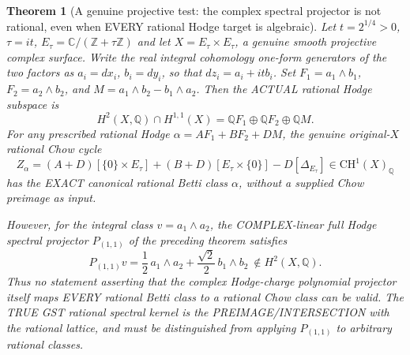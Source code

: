 \documentclass[11pt]{article}
\newtheorem{theorem}{Theorem}
\newcommand{\QQ}{\mathbb Q}
\newcommand{\CC}{\mathbb C}
\newcommand{\CH}{\mathrm{CH}}
\begin{document}
\begin{theorem}[A genuine projective test: the complex spectral projector is not rational, even when EVERY rational Hodge target is algebraic]
Let $t=2^{1/4}>0$, $\tau=it$,
$E_\tau=\CC/(\mathbb Z+\tau\mathbb Z)$ and let
$X=E_\tau\times E_\tau$, a genuine smooth projective
complex surface. Write the real integral cohomology
one-form generators of the two factors as
$a_i=dx_i$, $b_i=dy_i$, so that
$dz_i=a_i+it b_i$.
Set $F_1=a_1\wedge b_1$, $F_2=a_2\wedge b_2$, and
$M=a_1\wedge b_2-b_1\wedge a_2$.
Then the ACTUAL rational Hodge subspace is
\[
 \boxed{
 H^2(X,\QQ)\cap H^{1,1}(X)
 =\QQ F_1\oplus\QQ F_2\oplus\QQ M.
 }                                                        \tag{10}
\]
For any prescribed rational Hodge
$\alpha=A F_1+B F_2+D M$, the genuine original-$X$
rational Chow cycle
\[
 \boxed{
 Z_\alpha=(A+D)[\{0\}\times E_\tau]+
          (B+D)[E_\tau\times\{0\}]-
          D[\Delta_{E_\tau}]
          \in \CH^1(X)_\QQ
 }                                                        \tag{11}
\]
has the EXACT canonical rational Betti class $\alpha$,
without a supplied Chow preimage as input.

However, for the integral class
$v=a_1\wedge a_2$, the COMPLEX-linear
full Hodge spectral projector $P_{(1,1)}$ of the
preceding theorem satisfies
\[
 \boxed{
 P_{(1,1)}v=
 \frac12\,a_1\wedge a_2+
 \frac{\sqrt2}{2}\,b_1\wedge b_2
 \ \notin H^2(X,\QQ).
 }                                                        \tag{12}
\]
Thus no statement asserting that the complex Hodge-charge
polynomial projector itself maps EVERY rational Betti
class to a rational Chow class can be valid.
The TRUE GST rational spectral kernel is the
PREIMAGE/INTERSECTION with the rational lattice, and
must be distinguished from applying $P_{(1,1)}$
to arbitrary rational classes.
\end{theorem}
\end{document}
